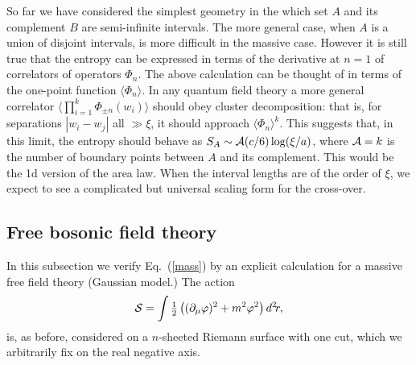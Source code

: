 \documentclass[preprint,aps]{revtex4}
\def\ffrac#1#2{\textstyle{#1\over#2}\displaystyle}
\begin{document}
So far we have considered the simplest geometry in the which set $A$ and
its complement $B$ are semi-infinite intervals. The more general case,
when $A$ is a union of disjoint intervals, is more difficult in the
massive case. However it is still true that the entropy can be expressed
in terms of the derivative at $n=1$ of correlators of operators
$\Phi_n$. The above calculation can be thought of in terms of the
one-point function $\langle\Phi_n\rangle$. In any quantum field theory
a more general correlator
$\langle\prod_{i=1}^{k}\Phi_{\pm n}(w_i)\rangle$ should obey cluster
decomposition: that is, for separations $|w_i-w_j|$ all $\gg\xi$, it
should approach $\langle\Phi_n\rangle^{k}$. This suggests that, in this
limit, the entropy should behave as $S_A\sim{\cal A}(c/6)\log(\xi/a)$,
where ${\cal A}=k$ is the number of boundary points between $A$ and its
complement. This would be the 1d version of the area
law\cite{s-93}. When the interval lengths are of the order of
$\xi$, we expect to see a complicated but universal scaling form for the
cross-over.


\def\be{\begin{equation}}
\def\ee{\end{equation}}

\def\bea{\begin{eqnarray}}
\def\eea{\end{eqnarray}}

\def\e{\epsilon}

\subsection{Free bosonic field theory}

In this subsection we verify Eq.~(\ref{mass}) by an explicit calculation for a
massive free field theory (Gaussian model.)
The action
\be
{\cal S}=\int \ffrac12
\left((\partial_\mu\varphi)^2+m^2\varphi^2\right)d^2\!r,
\ee
is, as before,
considered on a $n$-sheeted Riemann surface with one cut, which we
arbitrarily fix on the real negative axis.
\end{document}
